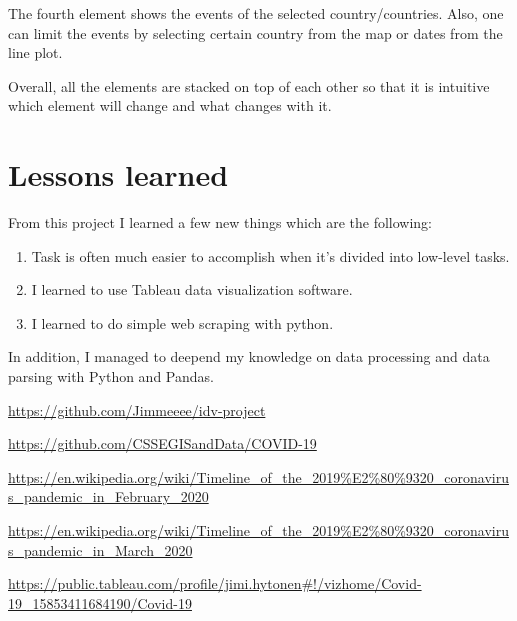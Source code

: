 \documentclass[11pt]{article}
\begin{document}
The fourth element shows the events of the selected country/countries. Also, one can limit the events by selecting certain country from the map or dates from the line plot.

Overall, all the elements are stacked on top of each other so that it is intuitive which element will change and what changes with it.


\section{Lessons learned}

From this project I learned a few new things which are the following:
\begin{enumerate}
\item
Task is often much easier to accomplish when it's divided into low-level tasks.
\item
I learned to use Tableau data visualization software.
\item
I learned to do simple web scraping with python.
\end{enumerate}
In addition, I managed to deepend my knowledge on data processing and data parsing with Python and Pandas.


\begin{thebibliography}{9}
 \url{https://github.com/Jimmeeee/idv-project}

 \url{https://github.com/CSSEGISandData/COVID-19}

 \url{https://en.wikipedia.org/wiki/Timeline_of_the_2019%E2%80%9320_coronavirus_pandemic_in_February_2020}

 \url{https://en.wikipedia.org/wiki/Timeline_of_the_2019%E2%80%9320_coronavirus_pandemic_in_March_2020}

 \url{https://public.tableau.com/profile/jimi.hytonen#!/vizhome/Covid-19_15853411684190/Covid-19}
\end{thebibliography}
\end{document}
